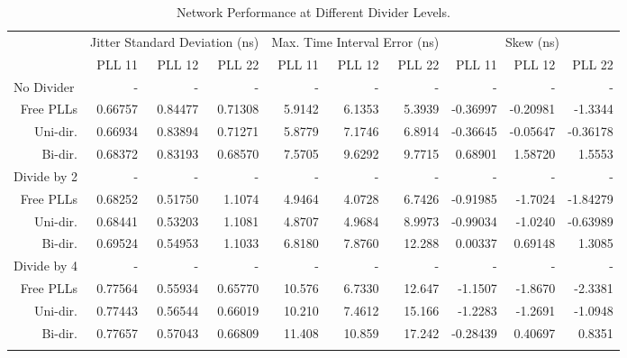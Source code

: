 \begin{table}[!ht]
    \begin{center}
        \begin{footnotesize}
            \setlength{\tabcolsep}{.9\tabcolsep}
            \begin{tabular}{ll|r|r|r|r|r|r|r|r|r|}           
                \cline{3-11}
                && \multicolumn{3}{c|}{Jitter Standard Deviation (ns)} & \multicolumn{3}{c|}{Max. Time Interval Error (ns)} & \multicolumn{3}{c|}{Skew (ns)} \T\\
                \cline{3-11} 
                &&PLL 11&PLL 12&PLL 22    &PLL 11&PLL 12&PLL 22    &PLL 11&PLL 12&PLL 22\T\\
                \hline
                \multicolumn{2}{|l|}{No Divider}&-&-&-&-&-&-&-&-&-\T\\
                \multicolumn{2}{|r|}{Free PLLs} &0.66757 &0.84477 &0.71308    &5.9142 &6.1353 &5.3939    &-0.36997 &-0.20981 &-1.3344  \T\\
                \multicolumn{2}{|r|}{Uni-dir.}  &0.66934 &0.83894 &0.71271    &5.8779 &7.1746 &6.8914    &-0.36645 &-0.05647 &-0.36178 \T\\
                \multicolumn{2}{|r|}{Bi-dir.}   &0.68372 &0.83193 &0.68570    &7.5705 &9.6292 &9.7715    & 0.68901 & 1.58720 & 1.5553  \T\\
                \hline
                \multicolumn{2}{|l|}{Divide by 2}&-&-&-&-&-&-&-&-&-\T\\
                \multicolumn{2}{|r|}{Free PLLs} &0.68252 &0.51750 &1.1074     &4.9464 &4.0728 &6.7426    &-0.91985 &-1.7024  &-1.84279 \T\\
                \multicolumn{2}{|r|}{Uni-dir.}  &0.68441 &0.53203 &1.1081     &4.8707 &4.9684 &8.9973    &-0.99034 &-1.0240  &-0.63989 \T\\
                \multicolumn{2}{|r|}{Bi-dir.}   &0.69524 &0.54953 &1.1033     &6.8180 &7.8760 &12.288    & 0.00337 & 0.69148 & 1.3085  \T\\
                \hline
                \multicolumn{2}{|l|}{Divide by 4}&-&-&-&-&-&-&-&-&-\T\\
                \multicolumn{2}{|r|}{Free PLLs} &0.77564 &0.55934 &0.65770    &10.576 &6.7330 &12.647    &-1.1507  &-1.8670   &-2.3381 \T\\
                \multicolumn{2}{|r|}{Uni-dir.}  &0.77443 &0.56544 &0.66019    &10.210 &7.4612 &15.166    &-1.2283  &-1.2691   &-1.0948 \T\\
                \multicolumn{2}{|r|}{Bi-dir.}   &0.77657 &0.57043 &0.66809    &11.408 &10.859 &17.242    &-0.28439 & 0.40697  & 0.8351 \T\\
                \hline
                \B
            \end{tabular}
        \end{footnotesize}
        \caption{Network Performance at Different Divider Levels.}
        \label{table:div}
    \end{center}
    \vspace{-0.5cm}
\end{table}

